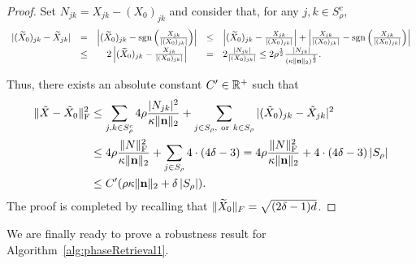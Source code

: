 \begin{proof}
Set $N_{jk} = X_{jk} - (X_0)_{jk}$ and consider that, for any $j, k \in S_\rho^c$, %
\[\begin{array}{rcccl}
|(\widetilde{X}_0)_{jk} - \widetilde{X}_{jk}| & = & \left|(\widetilde{X}_0)_{jk} - \mathrm{sgn}\left(\frac{X_{jk}}{|(X_0)_{jk}|}\right)\right| & \le & \left|(\widetilde{X}_0)_{jk} - \frac{X_{jk}}{|(X_0)_{jk}|}\right| + \left|\frac{X_{jk}}{|(X_0)_{jk}|} - \mathrm{sgn}\left(\frac{X_{jk}}{|(X_0)_{jk}|}\right)\right| \\
&\le &2\left|(\widetilde{X}_0)_{jk} - \frac{X_{jk}}{|(X_0)_{jk}|}\right| & = & 2\frac{|N_{jk}|}{|(X_0)_{jk}|} \le 2 \rho^{\frac{1}{2}} \frac{|N_{jk}|}{(\kappa \| \mathbf n \|_2)^{\frac{1}{2}}}.
\end{array}\]

Thus, there exists an absolute constant $C' \in \mathbb{R}^+$ such that%
\begin{align*}
\| \tilde{X} - \tilde{X}_0 \|^2_{\rm F} &\leq \sum_{j,k \in S_\rho^{c}} 4 \rho \frac{|N_{jk}|^2}{\kappa \| \mathbf n \|_2} + \sum_{j \in S_\rho, ~{\rm or}~ k \in S_\rho} |(\tilde{X}_0)_{jk} - \tilde{X}_{jk}|^2\\ &\leq 4 \rho \frac{\| N \|^2_{\rm F}}{\kappa \| \mathbf n \|_2} + \sum_{j \in S_\rho} 4 \cdot (4\delta - 3) = 4 \rho \frac{\| N \|^2_{\rm F}}{\kappa \| \mathbf n \|_2} + 4 \cdot (4\delta - 3) \left| S_\rho \right| \\ & \leq C' (\rho \kappa \| \mathbf n \|_2 + \delta \left| S_\rho \right|).
\end{align*}%
The proof is completed by recalling that $\lVert \widetilde{X}_0 \rVert_F = \sqrt{(2\delta - 1)d}$.
\end{proof}

We are finally ready to prove a robustness result for Algorithm~\ref{alg:phaseRetrieval1}.

